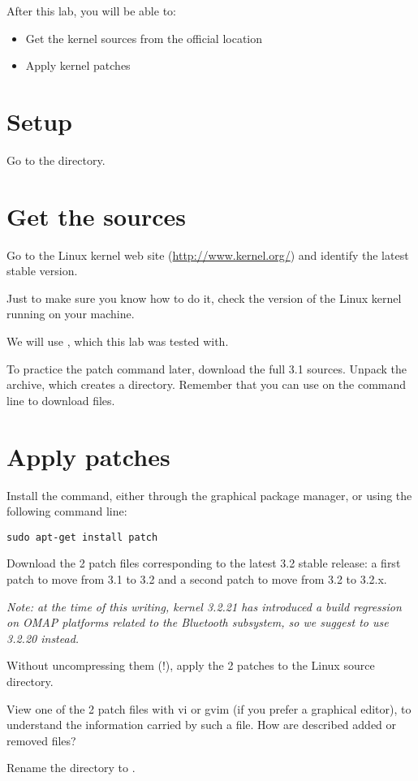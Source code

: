 
After this lab, you will be able to:
\begin{itemize}
\item Get the kernel sources from the official location
\item Apply kernel patches
\end{itemize}

\section{Setup}

Go to the  directory.

\section{Get the sources}

Go to the Linux kernel web site (\url{http://www.kernel.org/}) and
identify the latest stable version.

Just to make sure you know how to do it, check the version of the
Linux kernel running on your machine.

We will use , which this lab was tested with.

To practice the patch command later, download the full 3.1
sources. Unpack the archive, which creates a 
directory. Remember that you can use  on the command
line to download files.

\section{Apply patches}

Install the  command, either through the graphical package
manager, or using the following command line:

\begin{verbatim}
sudo apt-get install patch
\end{verbatim}

Download the 2 patch files corresponding to the latest 3.2 stable
release: a first patch to move from 3.1 to 3.2 and a second patch to
move from 3.2 to 3.2.x.

{\em Note: at the time of this writing, kernel 3.2.21 has introduced a
  build regression on OMAP platforms related to the Bluetooth
  subsystem, so we suggest to use 3.2.20 instead.}

Without uncompressing them (!), apply the 2 patches to the Linux
source directory.

View one of the 2 patch files with vi or gvim (if you prefer a
graphical editor), to understand the information carried by such a
file. How are described added or removed files?

Rename the  directory to .
